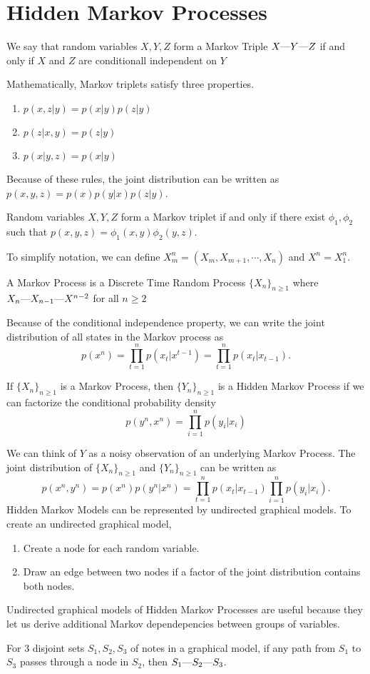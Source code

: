\section{Hidden Markov Processes}
\begin{definition}
	We say that random variables $X, Y, Z$ form a Markov Triple $X\text{\textemdash}Y\text{\textemdash}Z$ if and only if $X$ and $Z$ are conditionall independent on $Y$
	\label{defn:markov-triplet}
\end{definition}
Mathematically, Markov triplets satisfy three properties.
\begin{enumerate}
	\item $p(x, z | y) = p(x|y)p(z|y)$
	\item $p(z|x, y) = p(z|y)$
	\item $p(x|y, z) = p(x|y)$
\end{enumerate}
Because of these rules, the joint distribution can be written as $p(x, y, z) = p(x)p(y|x)p(z|y)$.
\begin{theorem}
	Random variables $X,Y,Z$ form a Markov triplet if and only if there exist $\phi_1, \phi_2$ such that $p(x, y, z) = \phi_1(x, y)\phi_2(y, z)$.
	\label{thm:markov-triplet}
\end{theorem}
To simplify notation, we can define $X_m^n = \left(X_m,X_{m+1},\cdots, X_n\right)$ and $X^n=X_1^n$.
\begin{definition}
	A Markov Process is a Discrete Time Random Process $\{X_n\}_{n\geq1}$ where $X_n\text{\textemdash}X_{n-1}\text{\textemdash}X^{n-2}$ for all $n\geq 2$
	\label{defn:markov-process}
\end{definition}
Because of the conditional independence property, we can write the joint distribution of all states in the Markov process as \[
	p(x^n) = \prod_{t=1}^n p(x_t|x^{t-1}) = \prod_{t=1}^np(x_t|x_{t-1}).
\]
\begin{definition}
	If $\{X_n\}_{n\geq1}$ is a Markov Process, then $\{Y_n\}_{n\geq1}$ is a Hidden Markov Process if we can factorize the conditional probability density
	\[
		p(y^n, x^n) = \prod_{i=1}^np(y_i|x_i)
	\]
	\label{defn:hidden-markov-process}
\end{definition}
We can think of $Y$ as a noisy observation of an underlying Markov Process.
The joint distribution of $\{X_n\}_{n\geq1}$ and $\{Y_n\}_{n\geq1}$ can be written as \[
	p(x^n, y^n) = p(x^n)p(y^n|x^n) = \prod_{t=1}^np(x_t|x_{t-1})\prod_{i=1}^np(y_i|x_i).
\]
Hidden Markov Models can be represented by undirected graphical models.
To create an undirected graphical model,
\begin{enumerate}
	\item Create a node for each random variable.
	\item Draw an edge between two nodes if a factor of the joint distribution contains both nodes.
\end{enumerate}
Undirected graphical models of Hidden Markov Processes are useful because they let us derive additional Markov dependepencies between groups of variables.
\begin{theorem}
	For 3 disjoint sets $S_1, S_2, S_3$ of notes in a graphical model, if any path from $S_1$ to $S_3$ passes through a node in $S_2$, then $S_1\text{\textemdash}S_2\text{\textemdash}S_3$.
	\label{thm:graphic-triplet}
\end{theorem}
